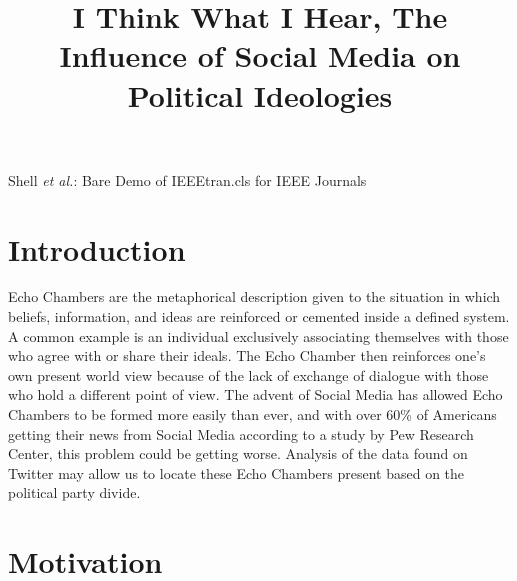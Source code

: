 \documentclass[journal]{IEEEtran}
\begin{document}
\title{I Think What I Hear, The Influence of Social Media on Political Ideologies}


\author{
}

%
{Shell \MakeLowercase{\textit{et al.}}: Bare Demo of IEEEtran.cls for IEEE Journals}


\maketitle



%
\IEEEpeerreviewmaketitle



\section{Introduction}

Echo Chambers are the metaphorical description given to the situation in which beliefs, information, and ideas are reinforced or cemented inside a defined system. A common example is an individual exclusively associating themselves with those who agree with or share their ideals. The Echo Chamber then reinforces one’s own present world view because of the lack of exchange of dialogue with those who hold a different point of view. The advent of Social Media has allowed Echo Chambers to be formed more easily than ever, and with over 60\% of Americans getting their news from Social Media according to a study by Pew Research Center, this problem could be getting worse. Analysis of the data found on Twitter may allow us to locate these Echo Chambers present based on the political party divide.

\section{Motivation}
\end{document}
